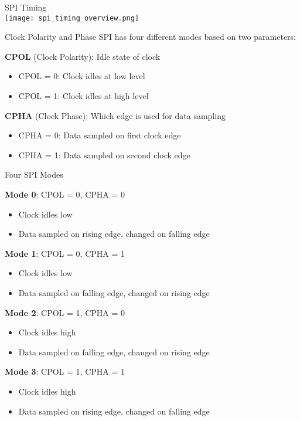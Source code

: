 \begin{definition}{SPI Timing}\\
    \texttt{[image: spi\_timing\_overview.png]}
\end{definition}

\begin{concept}{Clock Polarity and Phase}
SPI has four different modes based on two parameters:

\begin{minipage}{0.5\linewidth}
\textbf{CPOL} (Clock Polarity): Idle state of clock
    \begin{itemize}
        \item CPOL = 0: Clock idles at low level
        \item CPOL = 1: Clock idles at high level
    \end{itemize}
\end{minipage}
\begin{minipage}{0.5\linewidth}
\textbf{CPHA} (Clock Phase): Which edge is used for data sampling
    \begin{itemize}
        \item CPHA = 0: Data sampled on first clock edge
        \item CPHA = 1: Data sampled on second clock edge
    \end{itemize}
\end{minipage}
\end{concept}

\begin{concept}{Four SPI Modes}

\begin{minipage}{0.5\linewidth}
\textbf{Mode 0}: CPOL = 0, CPHA = 0
    \begin{itemize}
        \item Clock idles low
        \item Data sampled on rising edge, changed on falling edge
    \end{itemize}
\textbf{Mode 1}: CPOL = 0, CPHA = 1
    \begin{itemize}
        \item Clock idles low
        \item Data sampled on falling edge, changed on rising edge
    \end{itemize}
\end{minipage}
\begin{minipage}{0.5\linewidth}
\textbf{Mode 2}: CPOL = 1, CPHA = 0
    \begin{itemize}
        \item Clock idles high
        \item Data sampled on falling edge, changed on rising edge
    \end{itemize}
\textbf{Mode 3}: CPOL = 1, CPHA = 1
    \begin{itemize}
        \item Clock idles high
        \item Data sampled on rising edge, changed on falling edge
    \end{itemize}
\end{minipage}
\end{concept}

